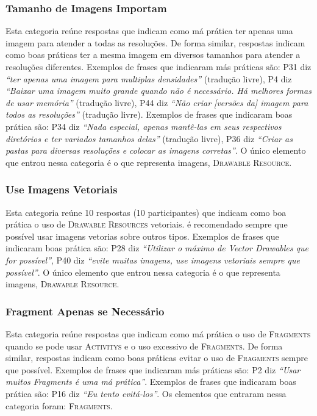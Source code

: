 \subsubsection{Tamanho de Imagens Importam}
Esta categoria re\'une respostas que indicam como m\'a pr\'atica ter apenas uma imagem para atender a todas as resolu\c{c}\~oes. De forma similar, respostas indicam como boas pr\'aticas ter a mesma imagem em diversos tamanhos para atender a resolu\c{c}\~oes diferentes. Exemplos de frases que indicaram m\'as pr\'aticas s\~ao: P31 diz \textit{``ter apenas uma imagem para multiplas densidades''} (tradu\c{c}\~ao livre), P4 diz \textit{``Baixar uma imagem muito grande quando n\~ao \'e necess\'ario. H\'a melhores formas de usar mem\'oria''} (tradu\c{c}\~ao livre), P44 diz \textit{``N\~ao criar [vers\~oes da] imagem para todos as resolu\c{c}\~oes''} (tradu\c{c}\~ao livre). Exemplos de frases que indicaram boas pr\'atica s\~ao: P34 diz \textit{``Nada especial, apenas mant\^e-las em seus respectivos diret\'orios e ter variados tamanhos delas''} (tradu\c{c}\~ao livre), P36 diz \textit{``Criar as pastas para diversas resolu\c{c}\~oes e colocar as imagens corretas''}. O \'unico elemento que entrou nessa categoria \'e o que representa imagens, \textsc{Drawable Resource}.


\subsubsection{Use Imagens Vetoriais}
Esta categoria re\'une 10 respostas (10 participantes) que indicam como boa pr\'atica o uso de \textsc{Drawable Resources} vetoriais. \'e recomendado sempre que poss\'ivel usar imagens vetorias sobre outros tipos. Exemplos de frases que indicaram boas pr\'atica s\~ao: P28 diz \textit{``Utilizar o m\'aximo de Vector Drawables que for poss\'ivel''}, P40 diz \textit{``evite muitas imagens, use imagens vetoriais sempre que poss\'ivel''}. O \'unico elemento que entrou nessa categoria \'e o que representa imagens, \textsc{Drawable Resource}.


\subsubsection{Fragment Apenas se Necess\'ario}
Esta categoria re\'une respostas que indicam como m\'a pr\'atica o uso de \textsc{Fragments} quando se pode usar \textsc{Activitys} e o uso excessivo de \textsc{Fragments}. De forma similar, respostas indicam como boas pr\'aticas evitar o uso de \textsc{Fragments} sempre que poss\'ivel. Exemplos de frases que indicaram m\'as pr\'aticas s\~ao: P2 diz \textit{``Usar muitos Fragments \'e uma m\'a pr\'atica''}. Exemplos de frases que indicaram boas pr\'atica s\~ao: P16 diz \textit{``Eu tento evit\'a-los''}. Os elementos que entraram nessa categoria foram: \textsc{Fragments}. 

